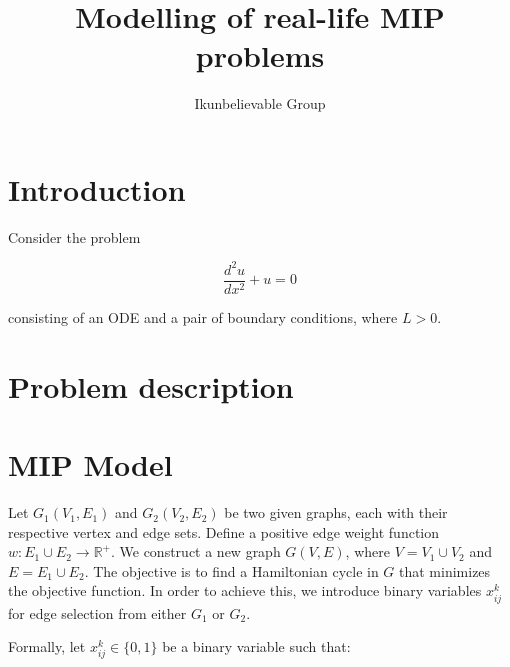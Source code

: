 \documentclass[11pt]{article}
\title{Modelling of real-life MIP problems}
\author{Ikunbelievable Group\footnotemark[1]}
\date{}
\begin{document}
\maketitle

\renewcommand{\thefootnote}{\fnsymbol{footnote}}
\renewcommand{\thefootnote}{\arabic{footnote}}

\section{Introduction}

Consider the problem

\begin{equation*}
  \frac{d^2 u}{d x^2}+u=0
\end{equation*}

consisting of an ODE and a pair of boundary conditions, where $L > 0$.

\section{Problem description}

\section{MIP Model}
Let $G_1(V_1, E_1)$ and $G_2(V_2, E_2)$ be two given graphs, each with their respective vertex and edge sets. Define a positive edge weight function $w : E_1 \cup E_2 \rightarrow \mathbb{R}^+$. We construct a new graph $G(V, E)$, where $V = V_1 \cup V_2$ and $E = E_1 \cup E_2$. The objective is to find a Hamiltonian cycle in $G$ that minimizes the objective function. In order to achieve this, we introduce binary variables $x_{ij}^k$ for edge selection from either $G_1$ or $G_2$.

Formally, let $x_{ij}^k \in \{0, 1\}$ be a binary variable such that:
\end{document}
